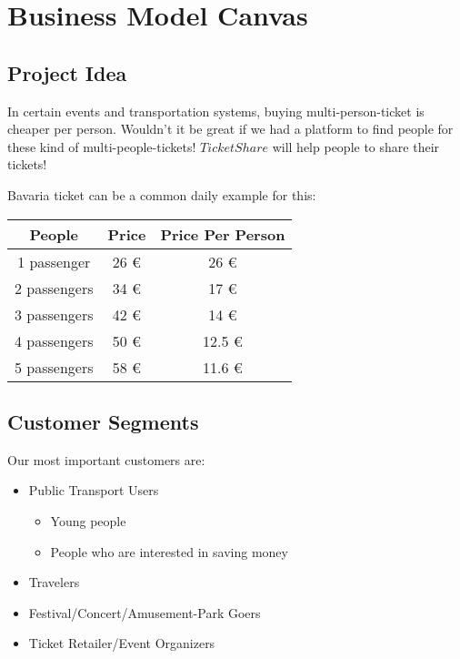 \documentclass{article}
\begin{document}

\newpage

\section{Business Model Canvas}
\subsection{Project Idea}

In certain events and transportation systems, buying multi-person-ticket is cheaper per person. Wouldn't it be great if we had a platform to find people for these kind of multi-people-tickets! $TicketShare$ will help people to share their tickets!

Bavaria ticket can be a common daily example for this:

\begin{table}[h]
\centering
\begin{tabular}{|c|c|c|}
\hline
\textbf{People} & \textbf{Price} & \textbf{Price Per Person} \\ \hline
1 passenger    & 26 €           & 26 €                      \\ \hline
2 passengers   & 34 €           & 17 €                      \\ \hline
3 passengers   & 42 €           & 14 €                      \\ \hline
4 passengers   & 50 €           & 12.5 €                    \\ \hline
5 passengers   & 58 €           & 11.6 €                    \\ \hline
\end{tabular}
\end{table}



\vspace{-5mm}
\subsection{Customer Segments}
Our most important customers are:

\begin{itemize}
    \item Public Transport Users
        \begin{itemize}
            \item Young people
            \item People who are interested in saving money
        \end{itemize}
    \item Travelers
    \item Festival/Concert/Amusement-Park Goers
    \item Ticket Retailer/Event Organizers
\end{itemize}
\end{document}

